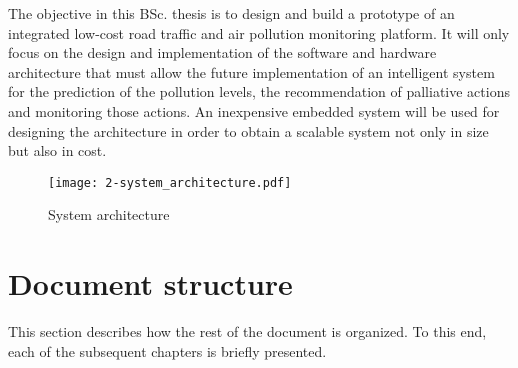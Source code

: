 The objective in this \ac{BSc.} thesis is to design and build a prototype of an integrated low-cost road traffic and air pollution monitoring platform. It will only focus on the design and implementation of the software and hardware architecture that must allow the future implementation of an intelligent system for the prediction of the pollution levels, the recommendation of palliative actions and monitoring those actions. An inexpensive embedded system will be used for designing the architecture in order to obtain a scalable system not only in size but also in cost.


\begin{figure}[!h]
	\begin{center}
		\texttt{[image: 2-system\_architecture.pdf]}	
		\caption{System architecture}
		\label{fig:2-system_architecture}
	\end{center}
\end{figure}






\section{Document structure}

This section describes how the rest of the document is organized. To this end, each of the subsequent chapters is briefly presented.

